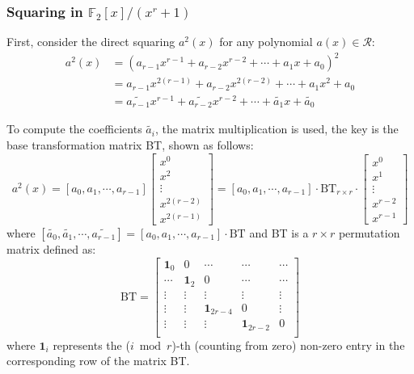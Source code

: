 \documentclass[preprint]{iacrtrans}
\begin{document}
\subsubsection{Squaring in $\mathbb{F}_2[x]/(x^r+1)$}
First, consider the direct squaring $a^2(x)$ for any polynomial $a(x)\in \mathcal{R}$:
\begin{align}
    a^2(x) &= (a_{r-1}x^{r-1}+a_{r-2}x^{r-2}+\cdots + a_{1}x + a_0)^2\\
    &= a_{r-1}x^{2(r-1)}+a_{r-2}x^{2(r-2)}+\cdots + a_1x^2 + a_0\\
    &= \widetilde{a_{r-1}}x^{r-1}+\widetilde{a_{r-2}}x^{r-2}+\cdots + \widetilde{a_{1}}x +\widetilde{a_0}
\end{align}

To compute the coefficients $\widetilde{a_{i}}$, the matrix multiplication is used, the key is the base transformation matrix BT, shown as follows:
\[
a^2(x)= [{a_{0}},{a_{1}},\cdots,{a_{r-1}}]\left[ \begin{array}{c}
x^{0} \\
x^{2} \\
\vdots\\
x^{2(r-2)}\\
x^{2(r-1)}
\end{array}
\right ]
=
[{a_0},{a_1},\cdots,{a_{r-1}}]
\cdot \text{BT}_{r\times r} \cdot
\left[ \begin{array}{c}
x^{0} \\
x^{1} \\
\vdots\\
x^{r-2}\\
x^{r-1}
\end{array}
\right ]
\]
where $[\widetilde{a_{0}},\widetilde{a_{1}},\cdots,\widetilde{a_{r-1}}]=[{a_{0}},{a_{1}},\cdots,{a_{r-1}}]
\cdot \text{BT}$ and BT is a $r\times r$ permutation matrix defined as:
\[
\text{BT} =
\left[ \begin{array}{ccccc}
\mathbf{1}_{0}&0&\cdots&\cdots&\cdots  \\
\cdots&\mathbf{1}_{2}&0 &\cdots&\cdots \\
\vdots&\vdots&\vdots&\vdots&\vdots\\
\vdots&\vdots&\mathbf{1}_{2r-4}&0&\vdots\\
\vdots&\vdots&\vdots&\mathbf{1}_{2r-2}&0\\
\end{array}
\right ]
\]
where $\mathbf{1}_{i}$ represents the ($i\bmod r$)-th (counting from zero) non-zero entry in the corresponding row of the matrix BT.
\end{document}
